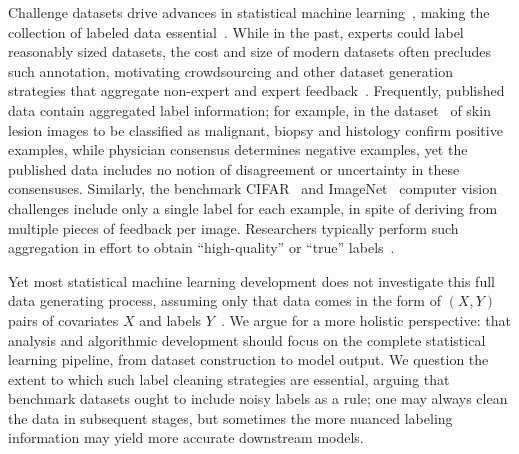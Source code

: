 \documentclass[11pt]{article}
\newcommand{\cc}[1]{\textcolor{cc}{[CC: #1]}}
\newcommand{\<}{\langle} %
\renewcommand{\>}{\rangle}
\begin{document}
Challenge datasets drive advances in statistical machine
learning~\cite{MarcusSaMa94, LewisYaRoLi04, AsuncionNe07, KrizhevskyHi09,
  DengDoSoLiLiFe09, RussakovskyDeSuKrSaMaHuKaKhBeBeFe15},
making the collection of
labeled data essential~\cite{Donoho17}.
%
While in the past, experts could label reasonably sized datasets, the cost
and size of modern datasets often precludes such annotation, motivating
crowdsourcing and other dataset generation strategies that aggregate
non-expert and expert feedback~\citep{DawidSk79,
  WhitehillWuBeMoRu09, RussakovskyDeSuKrSaMaHuKaKhBeBeFe15,
  CodellaRoTsCeDuGuHeKaLiMa19, GadreEtAl23}.
%
Frequently, published data contain aggregated label information; for
example, in the dataset~\cite{CodellaRoTsCeDuGuHeKaLiMa19}
of skin lesion images to be classified as
malignant, biopsy and histology confirm positive examples, while physician
consensus determines negative examples, yet the published data includes no
notion of disagreement or uncertainty in these consensuses.
%
Similarly, the benchmark CIFAR~\citep{KrizhevskyHi09} and
ImageNet~\citep{DengDoSoLiLiFe09, RussakovskyDeSuKrSaMaHuKaKhBeBeFe15}
computer vision challenges include only a single label for each example, in
spite of deriving from multiple pieces of feedback per image.
%
Researchers typically perform such aggregation in effort to obtain
``high-quality'' or ``true'' labels~\cite{DengDoSoLiLiFe09,
  RussakovskyDeSuKrSaMaHuKaKhBeBeFe15, DawidSk79,
  WhitehillWuBeMoRu09}.

Yet most statistical machine learning development does not investigate this
full data generating process, assuming only that data comes in the form of
$(X, Y)$ pairs of covariates $X$ and labels $Y$~\cite{Vapnik95,
  BoucheronBoLu05, BartlettJoMc06, HastieTiFr09}.
%
We argue for a more
holistic perspective: that analysis and algorithmic development should focus
on the complete statistical learning pipeline, from dataset construction to
model output.
%
We question the extent to which such label cleaning strategies are
essential, arguing that benchmark datasets ought to include noisy labels as
a rule; one may always clean the data in subsequent stages, but sometimes
the more nuanced labeling information may yield more accurate downstream
models.

\end{document}
